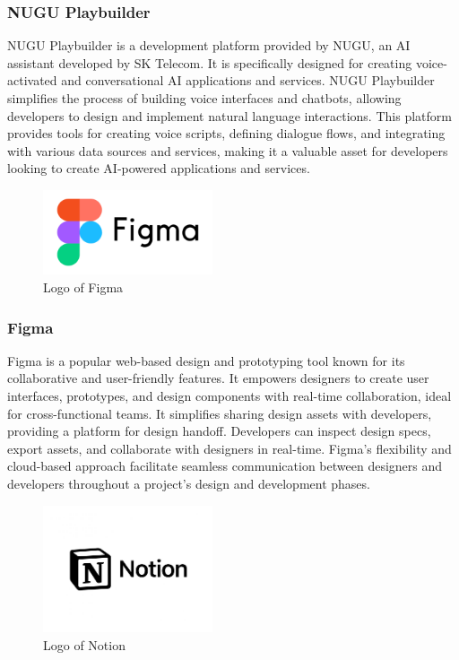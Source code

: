 \documentclass[conference]{IEEEtran}
\begin{document}
        \subsubsection{NUGU Playbuilder}
        NUGU Playbuilder is a development platform provided by NUGU, an AI assistant developed by SK Telecom. It is specifically designed for creating voice-activated and conversational AI applications and services. NUGU Playbuilder simplifies the process of building voice interfaces and chatbots, allowing developers to design and implement natural language interactions. This platform provides tools for creating voice scripts, defining dialogue flows, and integrating with various data sources and services, making it a valuable asset for developers looking to create AI-powered applications and services.\\

        \begin{figure}[htbp]
        \centerline{\includegraphics[width=5cm]{Images/logo/figma.png}}
        \label{fig}
        \caption{Logo of Figma}
        \end{figure}
        \subsubsection{Figma}
        Figma is a popular web-based design and prototyping tool known for its collaborative and user-friendly features. It empowers designers to create user interfaces, prototypes, and design components with real-time collaboration, ideal for cross-functional teams. It simplifies sharing design assets with developers, providing a platform for design handoff. Developers can inspect design specs, export assets, and collaborate with designers in real-time. Figma's flexibility and cloud-based approach facilitate seamless communication between designers and developers throughout a project's design and development phases.\\

        \begin{figure}[htbp]
        \centerline{\includegraphics[width=5cm]{Images/logo/notion.png}}
        \label{fig}
        \caption{Logo of Notion}
        \end{figure}
\end{document}

